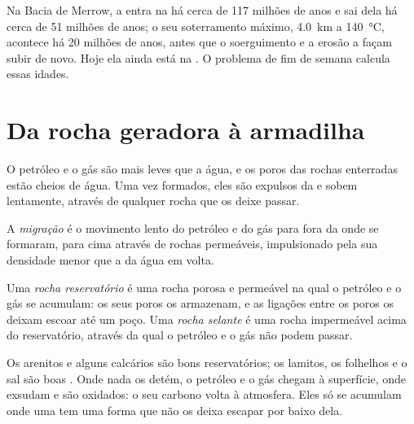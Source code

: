 Na Bacia de Merrow, a  entra na  há cerca de
117 milhões de anos e sai dela há cerca de 51 milhões de anos; o seu
soterramento máximo, \qty{4.0}{km} a \qty{140}{\degreeCelsius}, acontece há
20 milhões de anos, antes que o soerguimento e a erosão a façam subir de
novo. Hoje ela ainda está na . O problema de fim de semana
calcula essas idades.

\section{Da rocha geradora à armadilha}

O petróleo e o gás são mais leves que a água, e os poros das rochas
enterradas estão cheios de água. Uma vez formados, eles são expulsos da
 e sobem lentamente, através de qualquer rocha que os deixe
passar.

\begin{definition}[Migração]\label{def:g11:fossil-fuel-geology:migration}
A \emph{migração} é o movimento lento do
petróleo e do gás para fora da  onde se formaram, para cima
através de rochas permeáveis, impulsionado pela sua densidade menor que a da
água em volta.
\end{definition}

\begin{definition}\label{def:g11:fossil-fuel-geology:reservoir}
Uma \emph{rocha reservatório} é
uma rocha porosa e permeável na qual o petróleo e o gás se acumulam: os seus
poros os armazenam, e as ligações entre os poros os deixam escoar até um
poço. Uma \emph{rocha selante} é uma rocha impermeável
acima do reservatório, através da qual o petróleo e o gás não podem passar.
\end{definition}

Os arenitos e alguns calcários são bons reservatórios; os lamitos, os
folhelhos e o sal são boas . Onde nada os detém, o petróleo e
o gás chegam à superfície, onde exsudam e são oxidados: o seu carbono volta
à atmosfera. Eles só se acumulam onde uma  tem uma forma que
não os deixa escapar por baixo dela.

